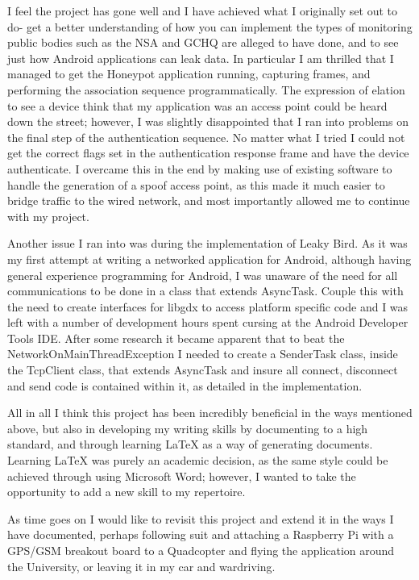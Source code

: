 I feel the project has gone well and I have achieved what I originally set out to do- get a better understanding of how you can implement the types of monitoring public bodies such as the NSA and GCHQ are alleged to have done, and to see just how Android applications can leak data. In particular I am thrilled that I managed to get the Honeypot application running, capturing frames, and performing the association sequence programmatically. The expression of elation to see a device think that my application was an access point could be heard down the street; however, I was slightly disappointed that I ran into problems on the final step of the authentication sequence. No matter what I tried I could not get the correct flags set in the authentication response frame and have the device authenticate. I overcame this in the end by making use of existing software to handle the generation of a spoof access point, as this made it much easier to bridge traffic to the wired network, and most importantly allowed me to continue with my project.

Another issue I ran into was during the implementation of Leaky Bird. As it was my first attempt at writing a networked application for Android, although having general experience programming for Android, I was unaware of the need for all communications to be done in a class that extends AsyncTask. Couple this with the need to create interfaces for libgdx to access platform specific code and I was left with a number of development hours spent cursing at the Android Developer Tools IDE. After some research it became apparent that to beat the NetworkOnMainThreadException I needed to create a SenderTask class, inside the TcpClient class, that extends AsyncTask and insure all connect, disconnect and send code is contained within it, as detailed in the implementation.

All in all I think this project has been incredibly beneficial in the ways mentioned above, but also in developing my writing skills by documenting to a high standard, and through learning LaTeX as a way of generating documents. Learning LaTeX was purely an academic decision, as the same style could be achieved through using Microsoft Word; however, I wanted to take the opportunity to add a new skill to my repertoire. 

As time goes on I would like to revisit this project and extend it in the ways I have documented, perhaps following suit and attaching a Raspberry Pi with a GPS/GSM breakout board to a Quadcopter and flying the application around the University, or leaving it in my car and wardriving.


\clearpage